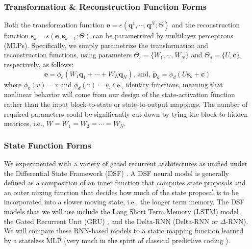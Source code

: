 \documentclass[smallabstract,smallcaptions]{dccpaper}
\begin{document}
\subsubsection{Transformation \& Reconstruction Function Forms}
Both the transformation function $\mathbf{e} = e(\mathbf{q}^1, \cdots, \mathbf{q}^N ; \Theta)$ and the reconstruction function $\mathbf{s}_k = s(\mathbf{e}, \mathbf{s}_{k-1} ; \Theta)$ can be parametrized by multilayer perceptrons (MLPs).
Specifically, we simply parametrize the transformation and reconstruction functions, using parameters $\Theta_t = \{W_1, \cdots, W_N\}$ and $\Theta_d = \{U, \mathbf{c}\}$, respectively, as follows:
\begin{equation}
\mathbf{e} = \phi_e(W_1 \mathbf{q}_1 + \cdots + W_N \mathbf{q}_N) \mbox{, and, }
\widetilde{\mathbf{p}}_k = \phi_d(U \mathbf{s}_k + \mathbf{c})
\nonumber %
\end{equation}
where $\phi_e(v) = v$ and $\phi_d(v) = v$, i.e., identity functions, meaning that nonlinear behavior will come from our design of the state-activation function rather than the input block-to-state or state-to-output mappings. The number of required parameters could be significantly cut down by tying the block-to-hidden matrices, i.e., $W = W_1 = W_2 = \cdots = W_N$.

\subsubsection{State Function Forms}
\label{state_fun}
We experimented with a variety of gated recurrent architectures as unified under the Differential State Framework (DSF) \cite{ororbia2017diff}. A DSF neural model is generally defined as a composition of an inner function that computes state proposals and an outer mixing function that decides how much of the state proposal is to be incorporated into a slower moving state, i.e., the longer term memory.
The DSF models that we will use include the Long Short Term Memory (LSTM) model \cite{hochreiter1997long}, the Gated Recurrent Unit (GRU) \cite{chung2014empirical}, and the Delta-RNN (Delta-RNN or $\Delta$-RNN). We will compare these RNN-based models to a static mapping function learned by a stateless MLP (very much in the spirit of classical predictive coding \cite{spratling2017pred}).
\end{document}
